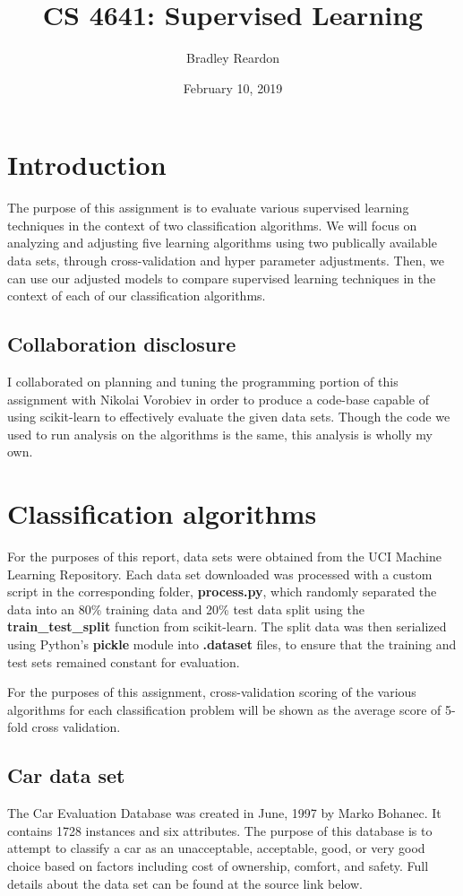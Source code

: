 \documentclass{article}
\title{\textbf{CS 4641:} Supervised Learning}
\author{Bradley Reardon}
\date{February 10, 2019}
\begin{document}
    \maketitle

    \section{Introduction}
    The purpose of this assignment is to evaluate various supervised learning techniques in the context of two classification algorithms. We will focus on analyzing and adjusting five learning algorithms using two publically available data sets, through cross-validation and hyper parameter adjustments. Then, we can use our adjusted models to compare supervised learning techniques in the context of each of our classification algorithms.

    \subsection{Collaboration disclosure}
    I collaborated on planning and tuning the programming portion of this assignment with Nikolai Vorobiev in order to produce a code-base capable of using scikit-learn to effectively evaluate the given data sets. Though the code we used to run analysis on the algorithms is the same, this analysis is wholly my own.

    \section{Classification algorithms}
    For the purposes of this report, data sets were obtained from the UCI Machine Learning Repository. Each data set downloaded was processed with a custom script in the corresponding folder, \textbf{process.py}, which randomly separated the data into an 80\% training data and 20\% test data split using the \textbf{train\_test\_split} function from scikit-learn. The split data was then serialized using Python's \textbf{pickle} module into \textbf{.dataset} files, to ensure that the training and test sets remained constant for evaluation.

    For the purposes of this assignment, cross-validation scoring of the various algorithms for each classification problem will be shown as the average score of 5-fold cross validation.

    \subsection{Car data set}
    The Car Evaluation Database was created in June, 1997 by Marko Bohanec. It contains 1728 instances and six attributes. The purpose of this database is to attempt to classify a car as an unacceptable, acceptable, good, or very good choice based on factors including cost of ownership, comfort, and safety. Full details about the data set can be found at the source link below.
\end{document}
